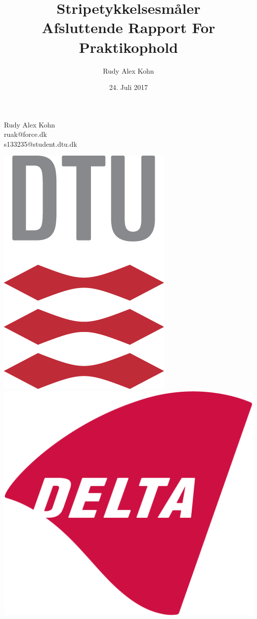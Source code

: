 \documentclass[11pt,a4paper,danish]{article}
\title{Stripetykkelsesmåler\\Afsluttende Rapport For Praktikophold}
\author{Rudy Alex Kohn}
\date{24. Juli 2017}
\begin{document}
\maketitle
\renewcommand{\contentsname}{Indeks}
\renewcommand{\listfigurename}{Figurliste}
\renewcommand{\figurename}{Figur}
\renewcommand\refname{Referencer}

\begin{center}
Rudy Alex Kohn\\
ruak@force.dk\\
s133235@student.dtu.dk
\end{center}

\vspace{25mm}

\begin{center}
\includegraphics[scale=0.3]{Billeder/kunlogo.png}
\includegraphics[scale=0.15]{Billeder/DELTA_1024px.png}
\end{center}
\end{document}
